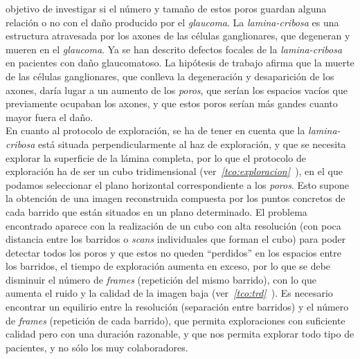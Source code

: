 objetivo de investigar si el número y tamaño de estos poros guardan
alguna relación o no con el daño producido por el
\emph{\gls{glaucoma}}. La \emph{\gls{lamina-cribosa}} es una
estructura atravesada por los axones de las células ganglionares, que
degeneran y mueren en el \emph{\gls{glaucoma}}. Ya se han descrito
defectos focales de la \emph{\gls{lamina-cribosa}} en pacientes con
daño glaucomatoso. La hipótesis de trabajo afirma que la muerte de las
células ganglionares, que conlleva la degeneración y desaparición de
los axones, daría lugar a un aumento de los \emph{poros}, que serían
los espacios vacíos que previamente ocupaban los axones, y que estos
poros serían más gandes cuanto mayor fuera el daño. \\
En cuanto al protocolo de exploración, se ha de tener en cuenta que la
\emph{\gls{lamina-cribosa}} está situada perpendicularmente al haz de
exploración, y que se necesita explorar la superficie de la lámina
completa, por lo que el protocolo de exploración ha de ser un cubo
tridimensional
(ver\emph{~\ref{tco:exploracion}~}), en el
que podamos seleccionar el plano horizontal correspondiente a los
\emph{poros}. Esto supone la obtención de una imagen reconstruida
compuesta por los puntos concretos de cada barrido que están situados
en un plano determinado. El problema encontrado aparece con la
realización de un cubo con alta resolución (con poca distancia entre
los barridos o \emph{scans} individuales que forman el cubo) para
poder detectar todos los poros y que estos no queden ``perdidos'' en
los espacios entre los barridos, el tiempo de exploración aumenta en
exceso, por lo que se debe disminuir el número de \emph{frames}
(repetición del mismo barrido), con lo que aumenta el ruido y la
calidad de la imagen baja
(ver\emph{~\ref{tco:trd}~}). Es necesario encontrar
un equilirio entre la resolución (separación entre barridos) y el
número de \emph{frames} (repetición de cada barrido), que permita
exploraciones con suficiente calidad pero con una duración razonable,
y que nos permita explorar todo tipo de pacientes, y no sólo los muy
colaboradores.
